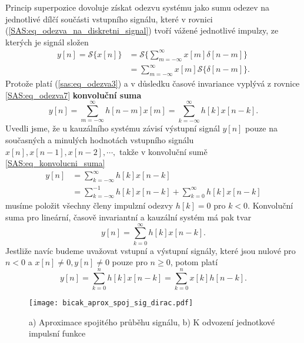 {      Princip superpozice dovoluje získat odezvu systému jako sumu odezev na jednotlivé dílčí
      součásti vstupního signálu, které v rovnici (\ref{SAS:eq_odezva_na_diskretni_signal}) tvoří
      vážené jednotlivé impulzy, ze kterých je signál složen
      \begin{align}
        y[n]=\mathcal{S}\{x[n]\}
          &=\mathcal{S}\{\sum_{m=-\infty}^{\infty}x[m]\delta[n-m]\}  \nonumber \\
          &=\sum_{m=-\infty}^{\infty}x[m]\mathcal{S}\{\delta[n-m]\}. \label{SAS:eq_odezva7}
      \end{align}
      Protože platí (\ref{sas:eq_odezva3}) a v důsledku časové invariance vyplývá z rovnice
      \ref{SAS:eq_odezva7} \textbf{konvoluční suma} 
      \begin{equation}\label{SAS:eq_konvolucni_suma}
        y[n]=\sum_{m=-\infty}^{\infty}h[n-m]x[m]=\sum_{k=-\infty}^{\infty}h[k]x[n-k].
      \end{equation}
      Uvedli jsme, že u kauzálního systému závisí výstupní signál $y[n]$ pouze na současných a
      minulých hodnotách vstupního signálu $x[n], x[n-1], x[n-2], \cdots ,$ takže v konvoluční sumě
      \ref{SAS:eq_konvolucni_suma}
      \begin{align}
        y[n]&=\sum_{k=-\infty}^{\infty}h[k]x[n-k]                              \nonumber \\
            &=\sum_{k=-\infty}^{-1}h[k]x[n-k] + \sum_{k=0}^{\infty}h[k]x[n-k]  \label{tky:eq001}
      \end{align}
      musíme položit všechny členy impulzní odezvy $h[k]=0$ pro $k<0$. Konvoluční suma pro
      lineární, časově invariantní a kauzální systém má pak tvar
      \begin{equation}\label{SAS:eq_konvolucni_suma3}
        y[n]=\sum_{k=0}^{\infty}h[k]x[n-k].
      \end{equation}
      Jestliže navíc budeme uvažovat vstupní a výstupní signály, které jsou nulové pro $n<0$ a
      $x[n]\neq0, y[n]\neq0$ pouze pro $n\geq0$, potom platí
      \begin{equation}\label{SAS:eq_konvolucni_suma4}
        y[n]=\sum_{k=0}^{n}h[k]x[n-k]=\sum_{k=0}^{n}x[k]h[n-k].
      \end{equation}
  
      \begin{figure}[ht!]
        \centering
        \texttt{[image: bicak\_aprox\_spoj\_sig\_dirac.pdf]}
        \caption[Aproximace spojitého průběhu signálu]{a) Aproximace spojitého průběhu signálu, b)
                 K odvození jednotkové impulsní funkce}
        \label{SAS:fig_Bicak_aprox_spoj_fce}
      \end{figure}
  
}
